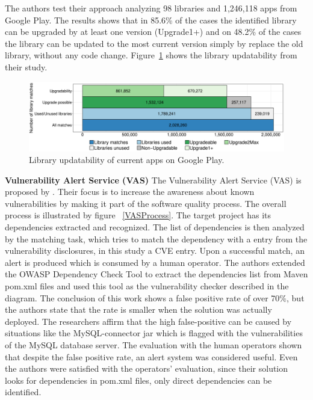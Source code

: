 \documentclass[pdf,bookmarks,colorlinks=true]{IEEEtran}
\begin{document}
The authors test their approach analyzing 98 libraries and 1,246,118 apps from Google Play. The results shows that in 85.6\% of the cases the identified library can be upgraded by at least one version (Upgrade1+) and on 48.2\% of the cases the library can be updated to the most current version simply by replace the old library, without any code change. Figure~\ref{LibraryUpdatability} shows the library updatability from their study.
 
\begin{figure}[h]
	\centering
	\includegraphics[scale=0.28]{LibraryUpdatability.png}
	\caption{Library updatability of current apps on Google Play.}
	\label{LibraryUpdatability}
\end{figure}



\textbf{Vulnerability Alert Service (VAS)}
The Vulnerability Alert Service (VAS) is proposed by \cite{Cadariu2015}. Their focus is to increase the awareness about known vulnerabilities by making it part of the software quality process. The overall process is illustrated by figure ~\ref{VASProcess}. The target project has its dependencies extracted and recognized. The list of dependencies is then analyzed by the matching task, which tries to match the dependency with a entry from the vulnerability disclosures, in this study a CVE entry. Upon a successful match, an alert is produced which is consumed by a human operator. The authors extended the OWASP Dependency Check Tool to extract the dependencies list from Maven pom.xml files and used this tool as the vulnerability checker described in the diagram.
The conclusion of this work shows a false positive rate of over 70\%, but the authors state that the rate is smaller when the solution was actually deployed. 
The researchers affirm that the high false-positive can be caused by situations like the MySQL-connector jar which is flagged with the vulnerabilities of the MySQL database server. The evaluation with the human operators shown that despite the false positive rate, an alert system was considered useful. Even the authors were satisfied with the operators' evaluation, since their solution looks for dependencies in pom.xml files, only direct dependencies can be identified.
\end{document}
